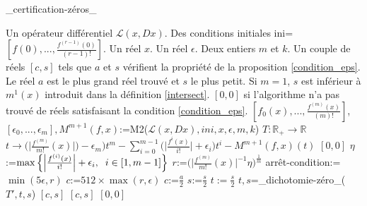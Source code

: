 \documentclass[a4paper,10pt]{article}
\begin{document}
	\begin{algorithm}
		\caption{\_certification-zéros\_}
		\begin{algorithmic}[1]
			\REQUIRE Un opérateur différentiel $\mathcal{L}(x,Dx)$. Des conditions initiales ini=$[f(0),...,\frac{f^{(r-1)}(0)}{(r-1)!}]$. Un réel $x$. Un réel $\epsilon$. Deux entiers $m$ et $k$.
			\ENSURE Un couple de réels $[c,s]$ tels que $a$ et $s$ vérifient la propriété de la proposition \ref{condition_eps}. Le réel $a$ est le plus grand réel trouvé et $s$ le plus petit. Si $m=1$, $s$ est inférieur à $m^1(x)$ introduit dans la définition \ref{intersect}. $[0,0]$ si l'algorithme n'a pas trouvé de réels satisfaisant la condition \eqref{condition_eps}.
			\STATE $[f_0(x),...,\frac{f^{(m)}(x)}{(m)!}]$,$[\epsilon_0,...,\epsilon_{m}], M^{m+1}(f,x)$:=M2($\mathcal{L}(x,Dx),ini,x,\epsilon,m,k$)
			\STATE 
			$T:\mathbb{R}_+\rightarrow \mathbb{R}$\\
			\hspace{7mm}$t\rightarrow \Big(\Big|\frac{f^{(m)}}{m!}(x)\Big|\Big)-\epsilon_m\Big)t^m-\sum_{i=0}^{m-1}\Big(\Big|\frac{f^{i}(x)}{i!}\Big|+\epsilon_i\Big)t^i-M^{m+1}(f,x)(t)$
			\RETURN $[0,0]$
			\ENDIF
			\STATE $\eta$:=$\max\Big\{\Big|\frac{f^{(i)}(x)}{i!}\Big|+\epsilon_i,\hspace{2mm}i \in [1,m-1]\Big\}$
			\STATE $r$:=$\Big(\Big|\frac{f^{(m)}}{m!}(x)\Big|^{-1}\eta\Big)^{\frac{1}{m}}$
			\STATE arrêt-condition:=$\min(5\epsilon,r)$
			\STATE $c$:=$512\times \max(r,\epsilon)$
			\STATE $c$:=$\frac{a}{2}$
			\ENDWHILE
			\STATE $s$:=$\frac{s}{2}$
			\ENDWHILE
			\STATE $t:=\frac{s}{2}$
			\STATE $t,s$=\_dichotomie-zéro\_($T',t,s$)
			\ENDWHILE
			\RETURN $[c,s]$
			\ELSE
			\RETURN $[c,s]$
			\ENDIF
			\ELSE
			\RETURN $[0,0]$
			\ENDIF
		\end{algorithmic}
		\label{certification}
	\end{algorithm}
\end{document}
